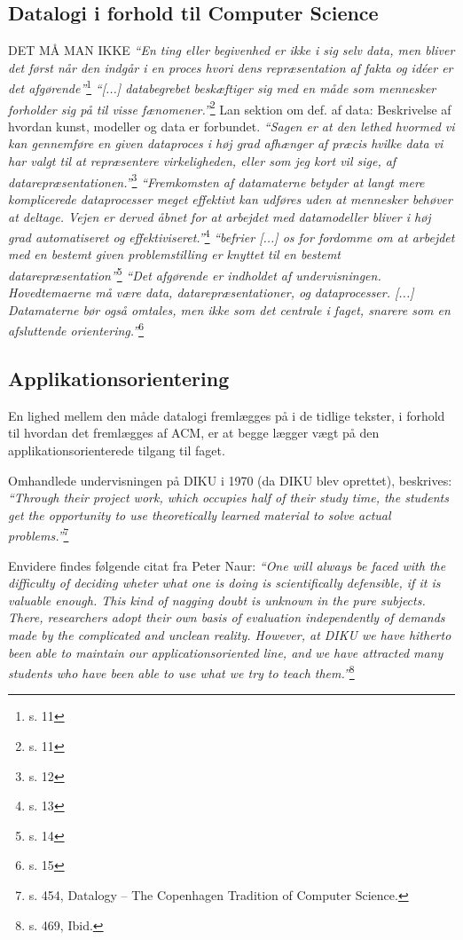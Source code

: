 \documentclass[10pt,a4paper]{article}
\newcommand{\citat}[2]{\vspace{0.2cm}\newline\textit{``#1''}\hspace{0.1cm}\footnote{#2}\vspace{0.2cm}\newline}
\begin{document}
\subsection{Datalogi i forhold til Computer Science}
DET MÅ MAN IKKE
\citat{En ting eller begivenhed er ikke i sig selv data, men bliver det først når den indgår i en proces hvori dens repræsentation af fakta og idéer er det afgørende}{s. 11}
\citat{[...] databegrebet beskæftiger sig med en måde som mennesker forholder 
sig på til visse fænomener.}{s. 11}
Lan sektion om def. af data: Beskrivelse af hvordan kunst, modeller og data er
forbundet. 
\citat{Sagen er at den lethed hvormed vi kan gennemføre en given dataproces i høj grad 
afhænger af præcis hvilke data vi har valgt til at repræsentere virkeligheden, 
eller som jeg kort vil sige, af \emph{datarepræsentationen}.}{s. 12}
\citat{Fremkomsten af datamaterne betyder at langt mere komplicerede dataprocesser 
meget effektivt kan udføres uden at mennesker behøver at deltage. Vejen er 
derved åbnet for at arbejdet med datamodeller bliver i høj grad automatiseret og 
effektiviseret.}{s. 13}
\citat{befrier [...] os for fordomme om at arbejdet med en bestemt given problemstilling
er knyttet til en bestemt datarepræsentation}{s. 14}
\citat{Det afgørende er indholdet af undervisningen. Hovedtemaerne må være data, 
datarepræsentationer, og dataprocesser. [...] Datamaterne bør også omtales, men
ikke som det centrale i faget, snarere som en afsluttende orientering.}{s. 15}


\subsection{Applikationsorientering}
En lighed mellem den måde datalogi fremlægges på i de tidlige tekster, i forhold til hvordan det fremlægges af ACM, er at begge lægger vægt på den applikationsorienterede tilgang til faget.

Omhandlede undervisningen på DIKU i 1970 (da DIKU blev oprettet), beskrives:
\citat{Through their project work, which occupies half of their study time, the students get the opportunity to use theoretically learned material to solve actual problems.}{s. 454, Datalogy -- The Copenhagen Tradition of Computer Science.}

Envidere findes følgende citat fra Peter Naur:
\citat{One will always be faced with the difficulty of deciding wheter what one is doing is scientifically defensible, if it is valuable enough. This kind of nagging doubt is unknown in the pure subjects. There, researchers adopt their own basis of evaluation independently of demands made by the complicated and unclean reality. However, at DIKU we have hitherto been able to maintain our applicationsoriented line, and we have attracted many students who have been able to use what we try to teach them.}{s. 469, Ibid.}
\end{document}
